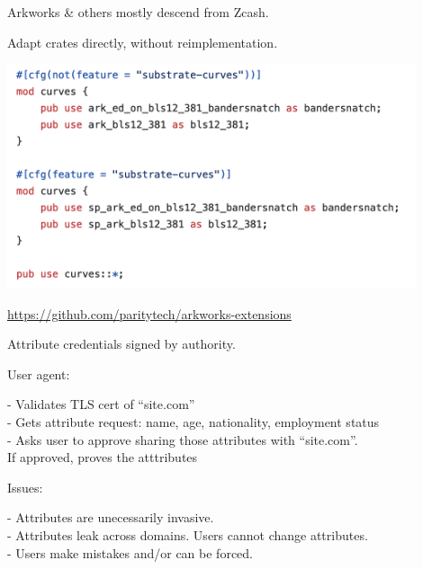 \documentclass{beamer}
\begin{document}
\begin{frame}

Arkworks \& others mostly descend from Zcash. \\ \smallskip

Adapt crates directly, without reimplementation.

\smallskip

\includegraphics[width=0.9\textwidth]{../images/use_curves.png}

\url{https://github.com/paritytech/arkworks-extensions}

\end{frame}





\begin{frame} %

Attribute credentials signed by authority.

\bigskip\smallskip

User agent: \\ \smallskip

- Validates TLS cert of ``site.com'' \\ \smallskip
- Gets attribute request: name, age, nationality, employment status \\ \smallskip
{}
- Asks user to approve sharing those attributes with ``site.com''. \\
\hspace{10pt} If approved, proves the atttributes

\bigskip\smallskip

Issues: \\ \smallskip

- Attributes are unecessarily invasive. \\ \smallskip
- Attributes leak across domains.  Users cannot change attributes. \\ \smallskip
- Users make mistakes and/or can be forced. \\ \medskip
\hspace{30pt}  

\end{frame}
\end{document}
